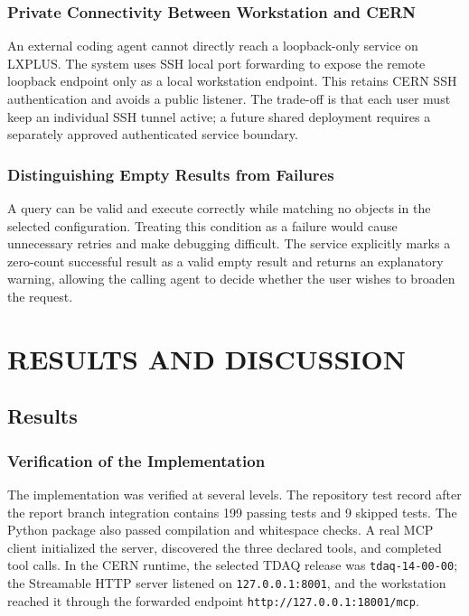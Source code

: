 \documentclass[12pt, a4paper]{report}
\begin{document}
\subsection{Private Connectivity Between Workstation and CERN}

An external coding agent cannot directly reach a loopback-only service on LXPLUS. The system uses SSH local port forwarding to expose the remote loopback endpoint only as a local workstation endpoint. This retains CERN SSH authentication and avoids a public listener. The trade-off is that each user must keep an individual SSH tunnel active; a future shared deployment requires a separately approved authenticated service boundary.

\subsection{Distinguishing Empty Results from Failures}

A query can be valid and execute correctly while matching no objects in the selected configuration. Treating this condition as a failure would cause unnecessary retries and make debugging difficult. The service explicitly marks a zero-count successful result as a valid empty result and returns an explanatory warning, allowing the calling agent to decide whether the user wishes to broaden the request.


\chapter{RESULTS AND DISCUSSION}

\section{Results}
\subsection{Verification of the Implementation}

The implementation was verified at several levels. The repository test record
after the report branch integration contains 199 passing tests and 9 skipped
tests. The Python package also passed compilation and whitespace checks. A
real MCP client initialized the server, discovered the three declared tools,
and completed tool calls. In the CERN runtime, the selected TDAQ release was
\texttt{tdaq-14-00-00}; the Streamable HTTP server listened on
\texttt{127.0.0.1:8001}, and the workstation reached it through the forwarded
endpoint \texttt{http://127.0.0.1:18001/mcp}.
\end{document}
